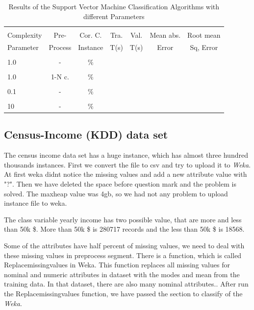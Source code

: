 \documentclass[a4paper]{article}
\begin{document}
\begin{table}
\begin{tabular}{|l| c | c | c | c |c |c |}

\hline & & & & & & \\
Complexity & Pre- &  Cor. C. & Tra. & Val. & Mean abs.  & Root mean \\
Parameter & Process & Instance & T(s) &  T(s) & Error & Sq, Error \\
\hline & & & & & & \\
1.0 & - &		   $\%$ &			& 		 & 		 &  \\ 
\hline & & & & & & \\
1.0  & 1-N c. &	   $\%$ &			& 		 & 		  &  \\ 
\hline & & & & & & \\
0.1	& - &			  $\%$ & 		& 		 & 		  &   \\ 
\hline & & & & & & \\
10	 & - &			   $\%$ &   		& 		 &  		 & \\ 
\hline
\end{tabular}
\caption{Results of the Support Vector Machine Classification Algorithms with different Parameters}
\end{table}


\subsection{Census-Income (KDD) data set}

The census income data set has a huge instance, which has almost three hundred
thousands  instances. First we convert the file to csv and try to upload it to
\emph{Weka}. At first weka didnt notice the missing values and add a new
attribute value with "?". Then we have deleted the space before question mark
and the problem is solved. The maxheap value was 4gb, so we had not any problem
to upload instance file to weka. 

The class variable yearly income has two possible value, that are more and less
than 50k \$. More than 50k \$ is 280717 records and the less than 50k \$ is
18568. 

Some of the attributes have half percent of missing values, we need to deal
with these missing values in preprocess segment. There is a function, which is
called Replacemissingvalues in Weka. This function replaces all missing values
for nominal and numeric attributes in dataset with the modes and mean from the
training data. In that dataset, there are also many nominal attributes.. After
run the Replacemissingvalues function, we have passed the section to classify
of the \emph{Weka}. 
\end{document}
